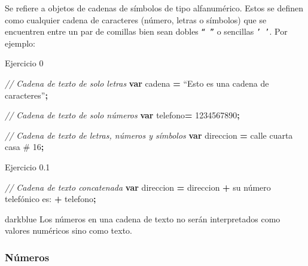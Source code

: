 \documentclass[
  12pt,
  letterpaper,
  twoside]{book}
\newenvironment{Shaded}{\begin{snugshade}}{\end{snugshade}}
\newcommand{\CommentTok}[1]{\textcolor[rgb]{0.56,0.35,0.01}{\textit{#1}}}
\newcommand{\KeywordTok}[1]{\textcolor[rgb]{0.13,0.29,0.53}{\textbf{#1}}}
\newcommand{\NormalTok}[1]{#1}
\newcommand{\OperatorTok}[1]{\textcolor[rgb]{0.81,0.36,0.00}{\textbf{#1}}}
\newcommand{\StringTok}[1]{\textcolor[rgb]{0.31,0.60,0.02}{#1}}
\begin{document}
Se refiere a objetos de cadenas de símbolos de tipo alfanumérico. Estos se definen como cualquier cadena de caracteres (número, letras o símbolos) que se encuentren entre un par de comillas bien sean dobles \texttt{“\ ”} o sencillas \texttt{’\ ’}. Por ejemplo:

Ejercicio 0

\begin{Shaded}
\begin{Highlighting}[]
\CommentTok{// Cadena de texto de solo letras}
\KeywordTok{var}\NormalTok{ cadena }\OperatorTok{=}\NormalTok{ “Esto es una cadena de caracteres”}\OperatorTok{;}

\CommentTok{// Cadena de texto de solo números}
\KeywordTok{var}\NormalTok{ telefono}\OperatorTok{=} \StringTok{\textquotesingle{}1234567890\textquotesingle{}}\OperatorTok{;}  
                     
\CommentTok{// Cadena de texto de letras, números y símbolos}
\KeywordTok{var}\NormalTok{ direccion }\OperatorTok{=} \StringTok{\textquotesingle{}calle cuarta casa \# 16\textquotesingle{}}\OperatorTok{;}
\end{Highlighting}
\end{Shaded}

Ejercicio 0.1

\begin{Shaded}
\begin{Highlighting}[]
\CommentTok{// Cadena de texto concatenada}
\KeywordTok{var}\NormalTok{ direccion }\OperatorTok{=}\NormalTok{ direccion }\OperatorTok{+} \StringTok{\textquotesingle{} su número telefónico es:\textquotesingle{}} \OperatorTok{+}\NormalTok{ telefono}\OperatorTok{;}
\end{Highlighting}
\end{Shaded}

\begin{bluebox2}

\begin{awesomeblock}{5pt}{\faLightbulb}{darkblue}
Los números en una cadena de texto no serán interpretados como valores numéricos sino como texto.

\end{awesomeblock}

\end{bluebox2}

\hypertarget{nuxfameros}{%
\subsubsection*{Números}\label{nuxfameros}}
\end{document}
